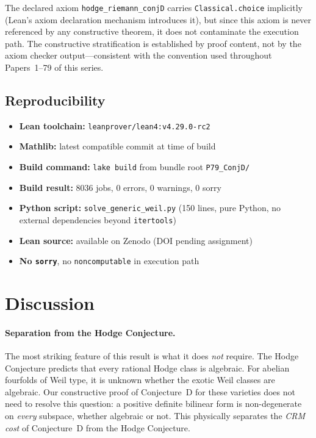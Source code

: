 \documentclass[11pt]{article}
\theoremstyle{plain}
\theoremstyle{definition}
\theoremstyle{remark}
\begin{document}
The declared axiom \texttt{hodge\_riemann\_conjD} carries
\texttt{Classical.choice} implicitly (Lean's axiom declaration mechanism
introduces it), but since this axiom is never referenced by any constructive
theorem, it does not contaminate the execution path.  The constructive
stratification is established by proof content, not by the axiom checker
output---consistent with the convention used throughout Papers~1--79 of this
series.

\subsection{Reproducibility}

\begin{itemize}[nosep]
\item \textbf{Lean toolchain:} \texttt{leanprover/lean4:v4.29.0-rc2}
\item \textbf{Mathlib:} latest compatible commit at time of build
\item \textbf{Build command:} \texttt{lake build} from bundle root
  \texttt{P79\_ConjD/}
\item \textbf{Build result:} 8036 jobs, 0 errors, 0 warnings, 0 sorry
\item \textbf{Python script:} \texttt{solve\_generic\_weil.py} (150 lines,
  pure Python, no external dependencies beyond \texttt{itertools})
\item \textbf{Lean source:} available on Zenodo (DOI pending assignment)
\item \textbf{No \texttt{sorry}}, no \texttt{noncomputable} in execution path
\end{itemize}


\section{Discussion}
\label{sec:discussion}

\paragraph{Separation from the Hodge Conjecture.}
The most striking feature of this result is what it does \emph{not}
require.  The Hodge Conjecture predicts that every rational Hodge class is
algebraic.  For abelian fourfolds of Weil type, it is unknown whether the
exotic Weil classes are algebraic.  Our constructive proof of Conjecture~D
for these varieties does not need to resolve this question: a positive
definite bilinear form is non-degenerate on \emph{every} subspace, whether
algebraic or not.  This physically separates the \emph{CRM cost} of
Conjecture~D from the Hodge Conjecture.
\end{document}

